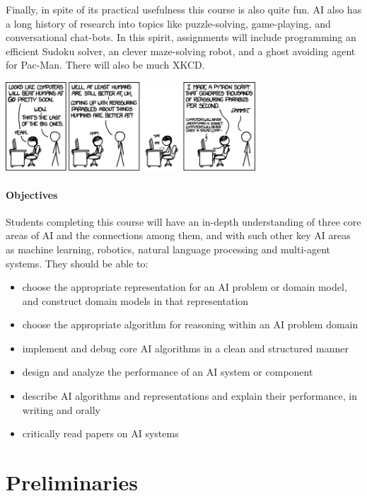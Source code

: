 \documentclass[11pt]{article}
\begin{document}
Finally, in spite of its practical usefulness this course is also
quite fun. AI also has a long history of research into topics like
puzzle-solving, game-playing, and conversational chat-bots. In this
spirit, assignments will include programming an efficient Sudoku
solver, an clever maze-solving robot, and a ghost avoiding agent for
Pac-Man. There will also be much XKCD.


\begin{center}
  \includegraphics[width=0.7\textwidth]{reassuring}
\end{center}

\paragraph{Objectives}

Students completing this course will have an in-depth understanding of
three core areas of AI and the connections among them, and with such
other key AI areas as machine learning, robotics, natural language
processing and multi-agent systems. They should be able to:


\begin{itemize}
\item choose the appropriate representation for an AI problem or
  domain model, and construct domain models in that representation
\item choose the appropriate algorithm for reasoning within an AI
  problem domain
\item implement and debug core AI algorithms in a clean and structured
  manner
\item design and analyze the performance of an AI system
  or component
\item describe AI algorithms and representations and explain their
  performance, in writing and orally
\item critically read papers on AI systems
\end{itemize} 

\section{Preliminaries} 
\end{document}
